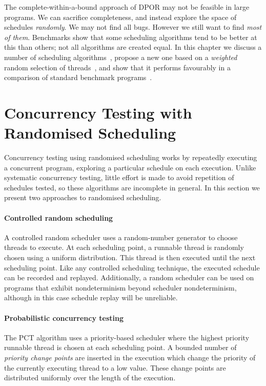 The complete-within-a-bound approach of DPOR may not be feasible in large
programs.  We can sacrifice completeness, and instead explore the space of
schedules \emph{randomly}.  We may not find all bugs.  However we still want to
find \emph{most of them}.  Benchmarks show that some scheduling algorithms tend
to be better at this than others; not all algorithms are created equal.  In this
chapter we discuss a number of scheduling algorithms~,
propose a new one based on a \emph{weighted} random selection of
threads~, and show that it performs favourably in a
comparison of standard benchmark programs~.

\section{Concurrency Testing with Randomised Scheduling}
\label{sec:algorithms-usual}

Concurrency testing using randomised scheduling works by repeatedly executing a
concurrent program, exploring a particular schedule on each execution.  Unlike
systematic concurrency testing, little effort is made to avoid repetition of
schedules tested, so these algorithms are incomplete in general.  In this
section we present two approaches to randomised scheduling.

\paragraph{Controlled random scheduling}
A controlled random scheduler uses a random-number generator to choose threads
to execute.  At each scheduling point, a runnable thread is randomly chosen
using a uniform distribution.  This thread is then executed until the next
scheduling point.  Like any controlled scheduling technique, the executed
schedule can be recorded and replayed.  Additionally, a random scheduler can be
used on programs that exhibit nondeterminism beyond scheduler nondeterminism,
although in this case schedule replay will be unreliable\cite{thomson2016}.

\paragraph{Probabilistic concurrency testing}
The PCT algorithm\cite{burckhardt2010} uses a priority-based scheduler where the
highest priority runnable thread is chosen at each scheduling point.  A bounded
number of \emph{priority change points} are inserted in the execution which
change the priority of the currently executing thread to a low value.  These
change points are distributed uniformly over the length of the execution.

